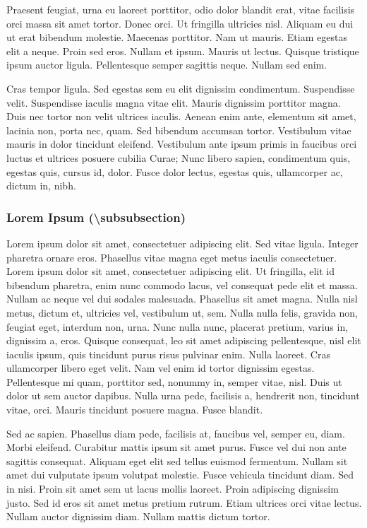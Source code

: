 \documentclass[nochapterpage,bigchapter,linedtoc,longdoc,colorback,accentcolor=tud4c]{tudreport}
\begin{document}
    Praesent feugiat, urna eu laoreet porttitor, odio dolor blandit erat, vitae facilisis orci massa sit amet tortor. Donec orci. Ut fringilla ultricies nisl. Aliquam eu dui ut erat bibendum molestie. Maecenas porttitor. Nam ut mauris. Etiam egestas elit a neque. Proin sed eros. Nullam et ipsum. Mauris ut lectus. Quisque tristique ipsum auctor ligula. Pellentesque semper sagittis neque. Nullam sed enim.

    Cras tempor ligula. Sed egestas sem eu elit dignissim condimentum. Suspendisse velit. Suspendisse iaculis magna vitae elit. Mauris dignissim porttitor magna. Duis nec tortor non velit ultrices iaculis. Aenean enim ante, elementum sit amet, lacinia non, porta nec, quam. Sed bibendum accumsan tortor. Vestibulum vitae mauris in dolor tincidunt eleifend. Vestibulum ante ipsum primis in faucibus orci luctus et ultrices posuere cubilia Curae; Nunc libero sapien, condimentum quis, egestas quis, cursus id, dolor. Fusce dolor lectus, egestas quis, ullamcorper ac, dictum in, nibh.

  \subsubsection{Lorem Ipsum (\textbackslash subsubsection)}

    Lorem ipsum dolor sit amet, consectetuer adipiscing elit. Sed vitae ligula. Integer pharetra ornare eros. Phasellus vitae magna eget metus iaculis consectetuer. Lorem ipsum dolor sit amet, consectetuer adipiscing elit. Ut fringilla, elit id bibendum pharetra, enim nunc commodo lacus, vel consequat pede elit et massa. Nullam ac neque vel dui sodales malesuada. Phasellus sit amet magna. Nulla nisl metus, dictum et, ultricies vel, vestibulum ut, sem. Nulla nulla felis, gravida non, feugiat eget, interdum non, urna. Nunc nulla nunc, placerat pretium, varius in, dignissim a, eros. Quisque consequat, leo sit amet adipiscing pellentesque, nisl elit iaculis ipsum, quis tincidunt purus risus pulvinar enim. Nulla laoreet. Cras ullamcorper libero eget velit. Nam vel enim id tortor dignissim egestas. Pellentesque mi quam, porttitor sed, nonummy in, semper vitae, nisl. Duis ut dolor ut sem auctor dapibus. Nulla urna pede, facilisis a, hendrerit non, tincidunt vitae, orci. Mauris tincidunt posuere magna. Fusce blandit.

    Sed ac sapien. Phasellus diam pede, facilisis at, faucibus vel, semper eu, diam. Morbi eleifend. Curabitur mattis ipsum sit amet purus. Fusce vel dui non ante sagittis consequat. Aliquam eget elit sed tellus euismod fermentum. Nullam sit amet dui vulputate ipsum volutpat molestie. Fusce vehicula tincidunt diam. Sed in nisi. Proin sit amet sem ut lacus mollis laoreet. Proin adipiscing dignissim justo. Sed id eros sit amet metus pretium rutrum. Etiam ultrices orci vitae lectus. Nullam auctor dignissim diam. Nullam mattis dictum tortor.
\end{document}
